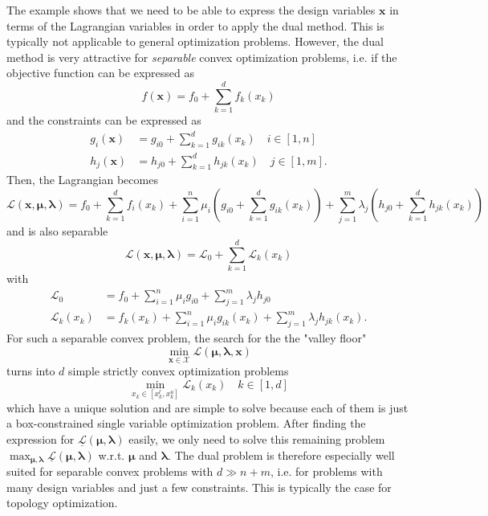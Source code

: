 The example shows that we need to be able to express the design variables $\mathbf{x}$ in terms of the Lagrangian variables in order to apply the dual method. This is typically not applicable to general optimization problems. However, the dual method is very attractive for \emph{separable} convex optimization problems, i.e. if the objective function can be expressed as 
\begin{equation}
    f(\mathbf{x}) = f_0 + \sum_{k=1}^d f_k(x_k)
\end{equation}
and the constraints can be expressed as 
\begin{align}
    g_i(\mathbf{x}) & = g_{i0} + \sum_{k=1}^d g_{ik}(x_k) \quad i \in [1,n]\\
    h_j(\mathbf{x}) & = h_{j0} + \sum_{k=1}^d h_{jk}(x_k) \quad j \in [1,m].
\end{align}
Then, the Lagrangian becomes 
\begin{equation}
    \mathcal{L} (\mathbf{x}, \pmb{\mu}, \pmb{\lambda}) = f_0 + \sum_{k=1}^d f_i(x_k) + \sum_{i=1}^n \mu_i \left(g_{i0} + \sum_{k=1}^d g_{ik}(x_k) \right) + \sum_{j=1}^m \lambda_j  \left(h_{j0} + \sum_{k=1}^d h_{jk}(x_k) \right)
\end{equation}
and is also separable
\begin{equation}
    \mathcal{L} (\mathbf{x}, \pmb{\mu}, \pmb{\lambda}) = \mathcal{L}_0 + \sum_{k=1}^d \mathcal{L}_k(x_k)
\end{equation}
with 
\begin{align}
    \mathcal{L}_0 &= f_0 + \sum_{i=1}^n \mu_i g_{i0} + \sum_{j=1}^m \lambda_j  h_{j0} \\
    \mathcal{L}_k (x_k) & = f_k(x_k) + \sum_{i=1}^n \mu_i g_{ik}(x_k) + \sum_{j=1}^m \lambda_j  h_{jk}(x_k). 
\end{align}
For such a separable convex problem, the search for the the "valley floor" 
\begin{equation}
    \min_{\mathbf{x}\in \mathcal{X}} \mathcal{L}(\pmb{\mu}, \pmb{\lambda}, \mathbf{x})
\end{equation} 
turns into $d$ simple strictly convex optimization problems 
\begin{equation}
    \min_{x_k \in [x_k^l, x_k^u]} \mathcal{L}_k(x_k) \quad k \in[1,d]
\end{equation}
which have a unique solution and are simple to solve because each of them is just a box-constrained single variable optimization problem. 
After finding the expression for $\underline{\mathcal{L}} (\pmb{\mu}, \pmb{\lambda})$ easily, we only need to solve this remaining problem $\max_{\pmb{\mu}, \pmb{\lambda}} \underline{\mathcal{L}} (\pmb{\mu}, \pmb{\lambda})$ w.r.t. $\pmb{\mu}$ and $\pmb{\lambda}$. The dual problem is therefore especially well suited for separable convex problems with $d \gg n+m$, i.e. for problems with many design variables and just a few constraints. This is typically the case for topology optimization.

